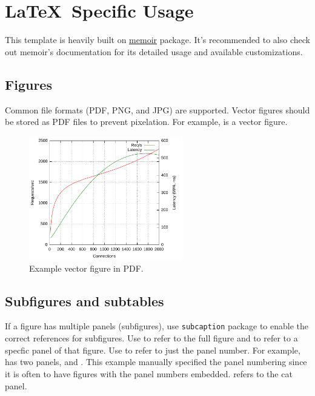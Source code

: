\chapter{{\LaTeX}\ Specific Usage}

This template is heavily built on \href{https://www.ctan.org/pkg/memoir}{memoir} package.
It's recommended to also check out memoir's documentation for its detailed usage and available customizations.


\section{Figures}
Common file formats (PDF, PNG, and JPG) are supported.
Vector figures should be stored as PDF files to prevent pixelation.
For example,  is a vector figure.

\begin{figure}[tbh]
  \centering
  \includegraphics[width=0.6\textwidth]{figures/just-a-plot}
  \caption{Example vector figure in PDF.}
  \label{fig:vector}
\end{figure}



\section{Subfigures and subtables}
If a figure has multiple panels (subfigures), use \texttt{subcaption} package to enable the correct references for subfigures.
Use \cmd{\fref} to refer to the full figure and \cmd{\fref} to refer to a specfic panel of that figure.
Use \cmd{\subcaptionref} to refer to just the panel number.
For example,  has two panels,  and .
This example manually specified the panel numbering since it is often to have figures with the panel numbers embedded.
 refers to the cat panel.

